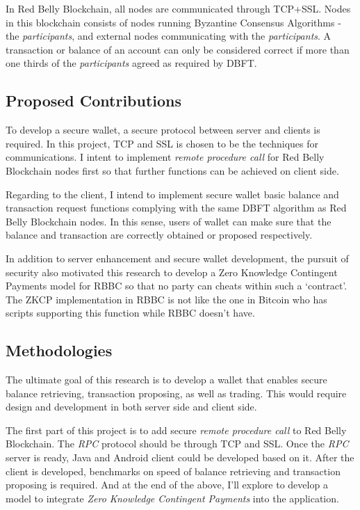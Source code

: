 \documentclass[12pt]{article}
\begin{document}
In Red Belly Blockchain, all nodes are communicated through TCP+SSL. Nodes in this blockchain consists of nodes running Byzantine Consensus Algorithms - the \textit{participants}, and external nodes communicating with the \textit{participants}. A transaction or balance of an account can only be considered correct if more than one thirds of the \textit{participants} agreed as required by DBFT.

\subsection{Proposed Contributions}

To develop a secure wallet, a secure protocol between server and clients is required. In this project, TCP and SSL is chosen to be the techniques for communications. I intent to implement \textit{remote procedure call} for Red Belly Blockchain nodes first so that further functions can be achieved on client side. 

Regarding to the client, I intend to implement secure wallet basic balance and transaction request functions complying with the same DBFT algorithm as Red Belly Blockchain nodes. In this sense, users of wallet can make sure that the balance and transaction are correctly obtained or proposed respectively.

In addition to server enhancement and secure wallet development, the pursuit of security also motivated this research to develop a Zero Knowledge Contingent Payments model for RBBC so that no party can cheats within such a `contract'. The ZKCP implementation in RBBC is not like the one in Bitcoin who has scripts supporting this function while RBBC doesn't have.

\subsection{Methodologies}

The ultimate goal of this research is to develop a wallet that enables secure balance retrieving, transaction proposing, as well as trading. This would require design and development in both server side and client side.

The first part of this project is to add secure \textit{remote procedure call} to Red Belly Blockchain. The \textit{RPC} protocol should be through TCP and SSL. Once the \textit{RPC} server is ready, Java and Android client could be developed based on it. After the client is developed, benchmarks on speed of balance retrieving and transaction proposing is required. And at the end of the above, I'll explore to develop a model to integrate \textit{Zero Knowledge Contingent Payments} into the application. 
\end{document}

